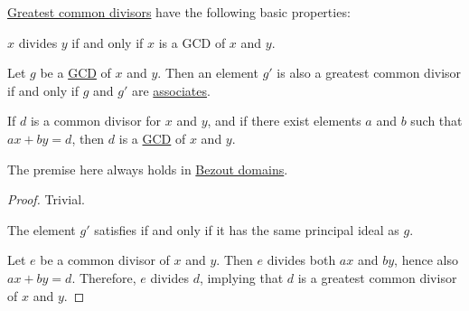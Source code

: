 \begin{proposition}\label{thm:def:gcd}
  \hyperref[def:gcd]{Greatest common divisors} have the following basic properties:
  \begin{thmenum}
     \( x \) divides \( y \) if and only if \( x \) is a GCD of \( x \) and \( y \).

     Let \( g \) be a \hyperref[def:gcd]{GCD} of \( x \) and \( y \). Then an element \( g' \) is also a greatest common divisor if and only if \( g \) and \( g' \) are \hyperref[def:domain_divisibility/associates]{associates}.

     If \( d \) is a common divisor for \( x \) and \( y \), and if there exist elements \( a \) and \( b \) such that \( ax + by = d \), then \( d \) is a \hyperref[def:gcd]{GCD} of \( x \) and \( y \).

    The premise here always holds in \hyperref[def:bezout_domain]{Bezout domains}.
  \end{thmenum}
\end{proposition}
\begin{proof}
   Trivial.

   The element \( g' \) satisfies  if and only if it has the same principal ideal as \( g \).

   Let \( e \) be a common divisor of \( x \) and \( y \). Then \( e \) divides both \( ax \) and \( by \), hence also \( ax + by = d \). Therefore, \( e \) divides \( d \), implying that \( d \) is a greatest common divisor of \( x \) and \( y \).
\end{proof}

